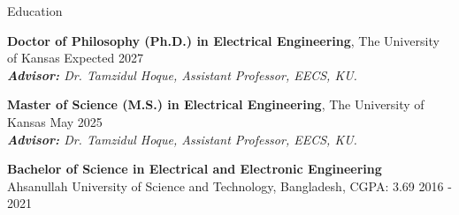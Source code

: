 \begin{rSection}{Education}

{\bf Doctor of Philosophy (Ph.D.) in Electrical Engineering}, The University of Kansas \hfill {Expected 2027}\\
\emph{\textbf{Advisor:} {Dr. Tamzidul Hoque, Assistant Professor, EECS, KU.}}

{\bf Master of Science (M.S.) in Electrical Engineering}, The University of Kansas \hfill {May 2025}\\
\emph{\textbf{Advisor:} {Dr. Tamzidul Hoque, Assistant Professor, EECS, KU.}}

{\bf Bachelor of Science in Electrical and Electronic Engineering} \\Ahsanullah University of Science and Technology, Bangladesh, CGPA: 3.69 \hfill {2016 - 2021}


\end{rSection}
